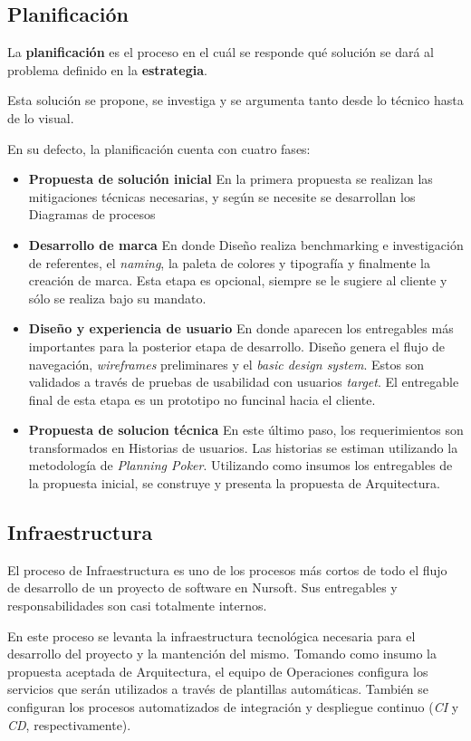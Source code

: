\subsection{Planificación}

La \textbf{planificación} es el proceso en el cuál se responde qué solución se dará al problema definido en la \textbf{estrategia}.

Esta solución se propone, se investiga y se argumenta tanto desde lo técnico hasta de lo visual.

En su defecto, la planificación cuenta con cuatro fases:
\begin{itemize}
    \item \textbf{Propuesta de solución inicial}
    En la primera propuesta se realizan las mitigaciones técnicas necesarias, y según se necesite se 
    desarrollan los Diagramas de procesos
    \item \textbf{Desarrollo de marca} En donde Diseño realiza benchmarking e investigación
    de referentes, el \textit{naming}, la paleta de colores y tipografía y
    finalmente la creación de marca. Esta etapa es opcional, siempre se le sugiere al cliente y
    sólo se realiza bajo su mandato.
    \item \textbf{Diseño y experiencia de usuario}
    En donde aparecen los entregables más importantes para la posterior etapa de desarrollo. 
    Diseño genera el flujo de navegación, \textit{wireframes} preliminares y el \textit{basic design system}.
    Estos son validados a través de pruebas de usabilidad con usuarios \textit{target}.
    El entregable final de esta etapa es un prototipo no funcinal hacia el cliente.
    \item \textbf{Propuesta de solucion técnica}
    En este último paso, los requerimientos son transformados en Historias de usuarios. Las historias se estiman utilizando la metodología de \textit{Planning Poker}.
    Utilizando como insumos los entregables de la propuesta inicial, se construye y presenta la propuesta de Arquitectura.
\end{itemize}
\subsection{Infraestructura}

El proceso de Infraestructura es uno de los procesos más cortos de todo el flujo de desarrollo de un proyecto de software en Nursoft.
Sus entregables y responsabilidades son casi totalmente internos.

En este proceso se levanta la infraestructura tecnológica necesaria para el desarrollo del proyecto y la mantención del mismo.
Tomando como insumo la propuesta aceptada de Arquitectura, el equipo de Operaciones configura los servicios que serán utilizados
a través de plantillas automáticas. También se configuran los procesos automatizados de integración y despliegue continuo (\textit{CI} y \textit{CD}, respectivamente).

